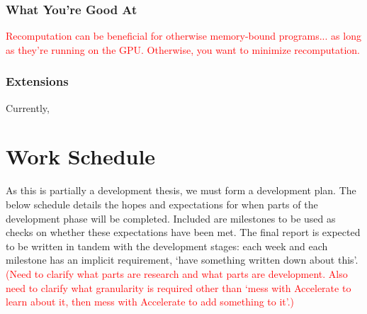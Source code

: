 \documentclass[a4paper,12pt]{article}
\newcommand{\red}[1]{\textcolor{red}{#1}}
\begin{document}
\subsubsection*{What You're Good At}
\red{Recomputation can be beneficial for otherwise memory-bound programs... as long as they're running on the GPU. Otherwise, you want to minimize recomputation.}

\subsubsection*{Extensions}
Currently, 

\section{Work Schedule}
As this is partially a development thesis, we must form a development plan.
The below schedule details the hopes and expectations for when parts of the development phase will be completed.
Included are milestones to be used as checks on whether these expectations have been met.
The final report is expected to be written in tandem with the development stages: each week and each milestone has an implicit requirement, `have something written down about this'.
\red{(Need to clarify what parts are research and what parts are development. Also need to clarify what granularity is required other than `mess with Accelerate to learn about it, then mess with Accelerate to add something to it'.)}
\end{document}

